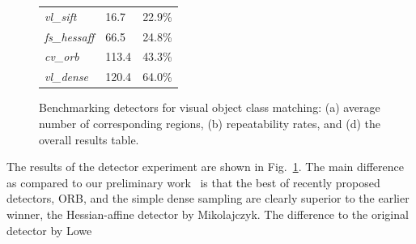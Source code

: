 \documentclass[journal]{IEEEtran}
\begin{document}
\begin{figure}[h]
\begin{center}
{\begin{tabular}{|l|l|l|}
\textit{vl\_sift}       &  16.7 & 22.9\%\\
\textit{fs\_hessaff}    &  66.5 & 24.8\%\\
\textit{cv\_orb}        & 113.4 & 43.3\%\\
\textit{vl\_dense}       & 120.4 & 64.0\%\\
\hline
\end{tabular}}
\caption{Benchmarking detectors for visual object class matching:
(a) average number of corresponding regions,
(b) repeatability rates,
and (d) the overall results table.\label{fig:results1}}
\end{center}
\end{figure}
%
The results of the detector experiment are shown in Fig.~\ref{fig:results1}.
The main difference as compared to our preliminary work~\cite{LanKanKam:2012}
is that the best of recently proposed detectors, ORB, and the simple
dense sampling are clearly superior to the earlier winner,
the Hessian-affine detector by Mikolajczyk. The difference to the original detector by Lowe
\end{document}
